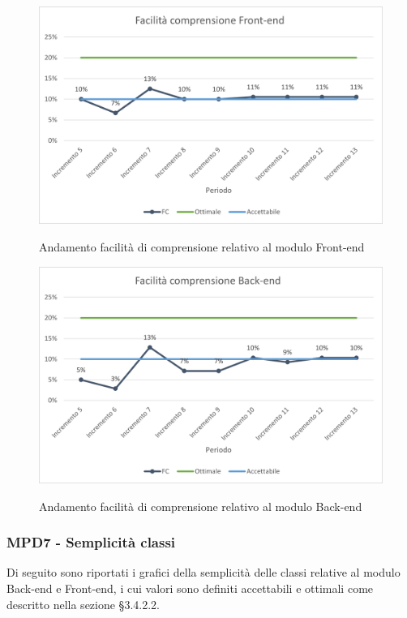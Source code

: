 \begin{figure}[H]
\centering
\includegraphics[scale=0.78]{res/ResocontoAttivitaDiVerifica/res/metriche/grafici/img/FCFE.png}\\
\caption{Andamento facilità di comprensione relativo al modulo Front-end}
\end{figure}

\begin{figure}[H]
\centering
\includegraphics[scale=0.78]{res/ResocontoAttivitaDiVerifica/res/metriche/grafici/img/FCBE.png}\\
\caption{Andamento facilità di comprensione relativo al modulo Back-end}
\end{figure}


\subsubsection{MPD7 - Semplicità classi}
Di seguito sono riportati i grafici della semplicità delle classi relative al modulo Back-end e Front-end, i cui valori sono definiti accettabili e ottimali come descritto nella sezione §3.4.2.2.\\

